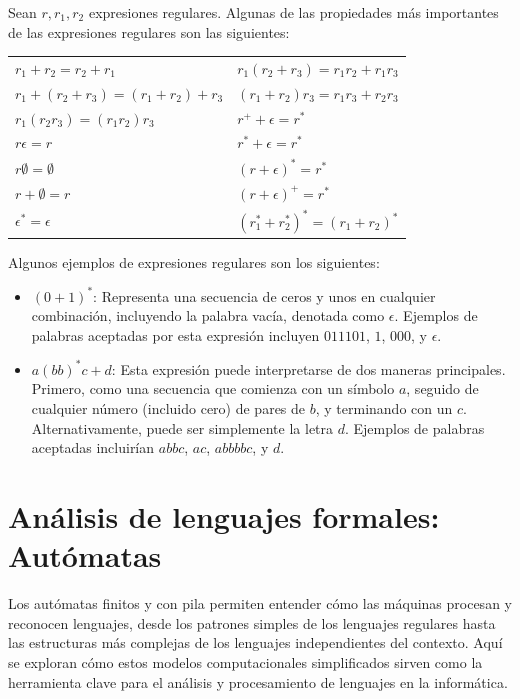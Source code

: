 Sean $r,r_1,r_2$ expresiones regulares. Algunas de las propiedades más importantes de las expresiones regulares son las siguientes:
\vspace{0.5cm}
\newline
\begin{tabular}{ll}
    $r_1 + r_2 = r_2 + r_1$ & $r_1(r_2+r_3) = r_1r_2 + r_1r_3$ \\
    $r_1 + (r_2 + r_3) = (r_1 + r_2) + r_3$ & $(r_1+r_2)r_3 = r_1r_3 + r_2r_3$ \\
    $r_1(r_2r_3) = (r_1r_2)r_3$ & $r^+ + \epsilon = r^*$ \\
    $r\epsilon = r$ & $r^* + \epsilon = r^*$ \\
    $r\emptyset = \emptyset$ & $(r+\epsilon)^* = r^*$ \\
    $r+\emptyset = r$ & $(r+\epsilon)^+ = r^*$ \\
    $\epsilon^* = \epsilon$ & $(r_1^*+r_2^*)^* = (r_1+r_2)^*$ \\
\end{tabular}
\vspace{0.5cm}

\noindent
Algunos ejemplos de expresiones regulares son los siguientes:
\begin{itemize}
    \item $(0+1)^*$: Representa una secuencia de ceros y unos en cualquier combinación, incluyendo la palabra vacía, denotada como $\epsilon$. Ejemplos de palabras aceptadas por esta expresión incluyen $011101$, $1$, $000$, y $\epsilon$.
    \item $a(bb)^*c+d$: Esta expresión puede interpretarse de dos maneras principales. Primero, como una secuencia que comienza con un símbolo $a$, seguido de cualquier número (incluido cero) de pares de $b$, y terminando con un $c$. Alternativamente, puede ser simplemente la letra $d$. Ejemplos de palabras aceptadas incluirían $abbc$, $ac$, $abbbbc$, y $d$.
\end{itemize}



\section{Análisis de lenguajes formales: Autómatas}\label{section:automat}
Los autómatas finitos y con pila permiten entender cómo las máquinas procesan y reconocen lenguajes, desde los patrones simples de los lenguajes regulares hasta las estructuras más complejas de los lenguajes independientes del contexto. Aquí se exploran cómo estos modelos computacionales simplificados sirven como la herramienta clave para el análisis y procesamiento de lenguajes en la informática.

